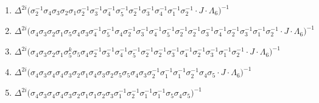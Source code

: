 \vspace{0.3cm}
\begingroup
\raggedbottom
\begin{enumerate}
    \item $\displaystyle \Delta^{2i} \big( \allowbreak\sigma_{2}^{-1}\allowbreak\sigma_{4}\allowbreak\sigma_{3}\allowbreak\sigma_{2}\allowbreak\sigma_{1}\allowbreak\sigma_{2}^{-1}\allowbreak\sigma_{3}^{-1}\allowbreak\sigma_{4}^{-1}\allowbreak\sigma_{5}^{-1}\allowbreak\sigma_{2}^{-1}\allowbreak\sigma_{3}^{-1}\allowbreak\sigma_{4}^{-1}\allowbreak\sigma_{1}^{-1}\allowbreak\sigma_{2}^{-1} \cdot J \cdot \Lambda_6 \big)^{-1}$
    \item $\displaystyle \Delta^{2i} \big( \allowbreak\sigma_{4}\allowbreak\sigma_{3}\allowbreak\sigma_{2}\allowbreak\sigma_{1}\allowbreak\sigma_{5}\allowbreak\sigma_{4}\allowbreak\sigma_{3}\allowbreak\sigma_{4}^{-1}\allowbreak\sigma_{5}^{-1}\allowbreak\sigma_{4}\allowbreak\sigma_{2}^{-1}\allowbreak\sigma_{3}^{-1}\allowbreak\sigma_{4}^{-1}\allowbreak\sigma_{5}^{-1}\allowbreak\sigma_{2}^{-1}\allowbreak\sigma_{2}^{-1}\allowbreak\sigma_{3}^{-1}\allowbreak\sigma_{4}^{-1}\allowbreak\sigma_{2}^{-1}\allowbreak\sigma_{3}^{-1}\allowbreak\sigma_{1}^{-1}\allowbreak\sigma_{2}^{-1} \cdot J \cdot \Lambda_6 \big)^{-1}$
    \item $\displaystyle \Delta^{2i} \big( \allowbreak\sigma_{4}\allowbreak\sigma_{3}\allowbreak\sigma_{2}\allowbreak\sigma_{1}\allowbreak\sigma_{5}^k\allowbreak\sigma_{5}\allowbreak\sigma_{4}\allowbreak\sigma_{2}^{-1}\allowbreak\sigma_{3}^{-1}\allowbreak\sigma_{4}^{-1}\allowbreak\sigma_{5}^{-1}\allowbreak\sigma_{2}^{-1}\allowbreak\sigma_{2}^{-1}\allowbreak\sigma_{3}^{-1}\allowbreak\sigma_{4}^{-1}\allowbreak\sigma_{2}^{-1}\allowbreak\sigma_{3}^{-1}\allowbreak\sigma_{1}^{-1}\allowbreak\sigma_{2}^{-1} \cdot J \cdot \Lambda_6 \big)^{-1}$
    \item $\displaystyle \Delta^{2i} \big( \allowbreak\sigma_{4}\allowbreak\sigma_{3}\allowbreak\sigma_{4}\allowbreak\sigma_{4}\allowbreak\sigma_{3}\allowbreak\sigma_{2}\allowbreak\sigma_{1}\allowbreak\sigma_{4}\allowbreak\sigma_{3}\allowbreak\sigma_{2}\allowbreak\sigma_{5}\allowbreak\sigma_{5}\allowbreak\sigma_{4}\allowbreak\sigma_{3}\allowbreak\sigma_{2}^{-1}\allowbreak\sigma_{1}^{-1}\allowbreak\sigma_{1}^{-1}\allowbreak\sigma_{2}^{-1}\allowbreak\sigma_{4}\allowbreak\sigma_{5} \cdot J \cdot \Lambda_6 \big)^{-1}$
    \item $\displaystyle \Delta^{2i} \big( \allowbreak\sigma_{4}\allowbreak\sigma_{3}\allowbreak\sigma_{4}\allowbreak\sigma_{4}\allowbreak\sigma_{3}\allowbreak\sigma_{2}\allowbreak\sigma_{1}\allowbreak\sigma_{1}\allowbreak\sigma_{2}\allowbreak\sigma_{3}\allowbreak\sigma_{1}^{-1}\allowbreak\sigma_{2}^{-1}\allowbreak\sigma_{1}^{-1}\allowbreak\sigma_{1}^{-1}\allowbreak\sigma_{5}\allowbreak\sigma_{4}\allowbreak\sigma_{5} \big)^{-1}$

\end{enumerate}
